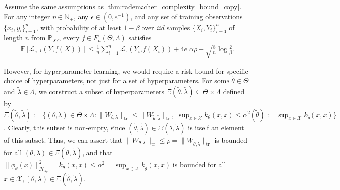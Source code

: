 \documentclass[runningheads, envcountsame, a4paper]{llncs}
\begin{document}
		\begin{theorem}
			\label{thm:specific_expected_loss_bound_for_multiclass_conditional_embedding_copy}
			Assume the same assumptions as \cref{thm:rademacher_complexity_bound_copy}. For any integer $n \in \mathbb{N}_{+}$, any $\epsilon \in (0, e^{-1})$, and any set of training observations $\{x_{i}, y_{i}\}_{i = 1}^{n}$, with probability of at least $1 - \beta$ over \textit{iid} samples $\{X_{i}, Y_{i}\}_{i = 1}^{n}$ of length $n$ from $\mathbb{P}_{X Y}$, every $f \in F_{n}(\Theta, \Lambda)$ satisfies
			\begin{equation}
			\begin{aligned}
			\mathbb{E}[\mathcal{L}_{e^{-1}}(Y, f(X))] \leq \frac{1}{n} \sum_{i = 1}^{n} \mathcal{L}_{\epsilon}(Y_{i}, f(X_{i})) + 4 e \; \alpha \rho + \sqrt{\frac{8}{n} \log{\frac{2}{\beta}}}.
			\end{aligned}
			\label{eq:specific_expected_loss_bound_for_multiclass_conditional_embedding_copy}
			\end{equation}
		\end{theorem}
	
		However, for hyperparameter learning, we would require a risk bound for specific choice of hyperparameters, not just for a set of hyperparameters. For some $\tilde{\theta} \in \Theta$ and $\tilde{\lambda} \in \Lambda$, we construct a subset of hyperparameters $\Xi(\tilde{\theta}, \tilde{\lambda}) \subseteq \Theta \times \Lambda$ defined by $\Xi(\tilde{\theta}, \tilde{\lambda}) := \{ (\theta, \lambda) \in \Theta \times \Lambda : \| W_{\theta, \lambda} \|_{\mathrm{tr}} \leq \| W_{\tilde{\theta}, \tilde{\lambda}} \|_{\mathrm{tr}}, \; \sup_{x \in \mathcal{X}} k_{\theta}(x, x) \leq \alpha^{2}(\tilde{\theta}) := \sup_{x \in \mathcal{X}} k_{\tilde{\theta}}(x, x) \}$. Clearly, this subset is non-empty, since $(\tilde{\theta}, \tilde{\lambda}) \in \Xi(\tilde{\theta}, \tilde{\lambda})$ is itself an element of this subset. Thus, we can assert that $\| W_{\theta, \lambda} \|_{\mathrm{tr}} \leq \rho = \| W_{\tilde{\theta}, \tilde{\lambda}} \|_{\mathrm{tr}}$ is bounded for all $(\theta, \lambda) \in \Xi(\tilde{\theta}, \tilde{\lambda})$, and that $\| \phi_{\theta}(x) \|_{\mathcal{H}_{k_{\theta}}}^{2} = k_{\theta}(x, x) \leq \alpha^{2} = \sup_{x \in \mathcal{X}} k_{\tilde{\theta}}(x, x)$ is bounded for all $x \in \mathcal{X}, (\theta, \lambda) \in \Xi(\tilde{\theta}, \tilde{\lambda})$.
	
\end{document}
